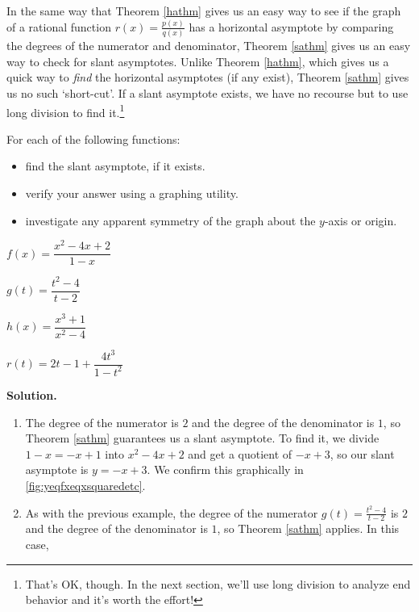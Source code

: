 In the same way that Theorem \ref{hathm} gives us an easy way to see if the graph of a rational function $r(x) = \frac{p(x)}{q(x)}$ has a horizontal asymptote by comparing the degrees of the numerator and denominator, Theorem \ref{sathm} gives us an easy way to check for slant asymptotes.  Unlike Theorem \ref{hathm}, which gives us a quick way to \textit{find} the horizontal asymptotes (if any exist), Theorem \ref{sathm} gives us no such `short-cut'.  If a slant asymptote exists, we have no recourse but to use long division to find it.\footnote{That's OK, though.  In the next section, we'll use long division to analyze end behavior and it's worth the effort!}  

\begin{ex} \label{saexample}  For each of the following functions:

\begin{itemize}

\item find the slant asymptote, if it exists.

\item  verify your answer using a graphing utility.

\item  investigate any apparent symmetry of the graph about the $y$-axis or origin.

\end{itemize}


\begin{shortenumerate}[MMMMMM]
\item  $f(x) = \dfrac{x^2-4x+2}{1-x}$  
\item  \label{sacancel} $g(t) = \dfrac{t^2-4}{t-2}$
\item  $h(x) = \dfrac{x^3+1}{x^2-4}$
\item  $r(t) = 2t-1+\dfrac{4t^3}{1-t^2}$ 
\end{shortenumerate}

{\bf Solution.}

\begin{enumerate}

\item  The degree of the numerator is $2$ and the degree of the denominator is $1$, so Theorem \ref{sathm} guarantees us a slant asymptote.  To find it, we divide $1-x = -x+1$ into $x^2-4x+2$ and get a quotient of $-x+3$, so our slant asymptote is $y=-x+3$.  We confirm this graphically in \autoref{fig:yeqfxeqxsquaredetc}.

\item  As with the previous example, the degree of the numerator $g(t) = \frac{t^2-4}{t-2}$ is $2$ and the degree of the denominator is $1$, so Theorem \ref{sathm} applies.  In this case, 


\end{enumerate}
\end{ex}
